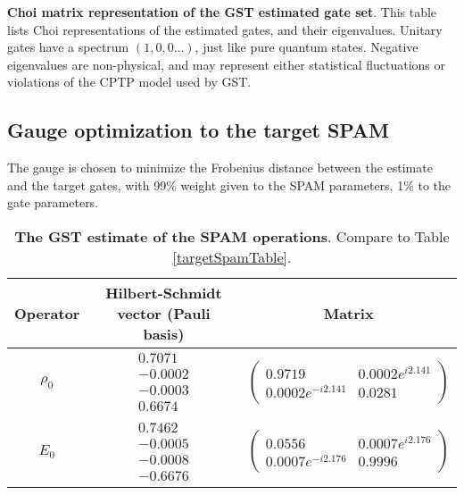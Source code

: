 {\begin{table}[h]
\begin{center}
\caption{\textbf{Choi matrix representation of the GST estimated gate set}.  This table lists Choi representations of the estimated gates, and their eigenvalues.  Unitary gates have a spectrum $(1,0,0\ldots)$, just like pure quantum states.  Negative eigenvalues are non-physical, and may represent either statistical fluctuations or violations of the CPTP model used by GST.\label{bestTargetGatesetChoiTable}}
\end{center}
\end{table}


\clearpage

\subsection{Gauge optimization to the target SPAM}
The gauge is chosen to minimize the Frobenius distance between the estimate and the target gates, with 99\% weight given to the SPAM parameters, 1\% to the gate parameters.

\begin{table}[h]
\begin{center}
\begin{tabular}[l]{|c|c|c|}
\hline
Operator & Hilbert-Schmidt vector (Pauli basis) & Matrix \\ \hline
$\rho_{0}$ & $ \begin{array}{c}
0.7071 \\ 
-0.0002 \\ 
-0.0003 \\ 
0.6674
 \end{array} $
 & $ \left(\!\!\begin{array}{cc}
0.9719 & 0.0002e^{i2.141} \\ 
0.0002e^{-i2.141} & 0.0281
 \end{array}\!\!\right) $
 \\ \hline
$E_{0}$ & $ \begin{array}{c}
0.7462 \\ 
-0.0005 \\ 
-0.0008 \\ 
-0.6676
 \end{array} $
 & $ \left(\!\!\begin{array}{cc}
0.0556 & 0.0007e^{i2.176} \\ 
0.0007e^{-i2.176} & 0.9996
 \end{array}\!\!\right) $
 \\ \hline
\end{tabular}

\caption{\textbf{The GST estimate of the SPAM operations}.  Compare to Table \ref{targetSpamTable}.\label{bestTargetSpamGatesetSpamTable}}
\end{center}
\end{table}

}
